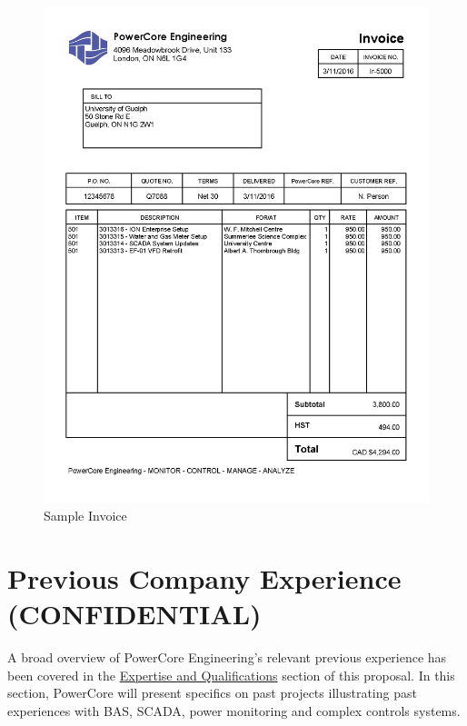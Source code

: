 \begin{figure}
		
		\begin{center}
		\includegraphics[width=6in, keepaspectratio=true]{../Images/Ir-5000.png}
		\end{center}
	\caption{Sample Invoice}
	\label{fig:Ir5000}
\end{figure}

\pagebreak

\section{Previous Company Experience (CONFIDENTIAL)}
\label{PreExp}

A broad overview of PowerCore Engineering's relevant previous experience has been covered in the \hyperref[ETQ:PCEExp]{Expertise and Qualifications} section of this proposal.  In this section, PowerCore will present specifics on past projects illustrating past experiences with BAS, SCADA, power monitoring and complex controls systems.


